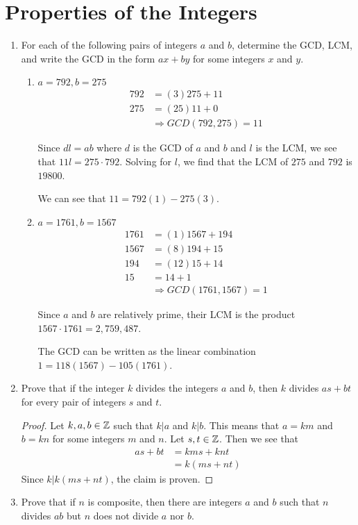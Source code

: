 \section{Properties of the Integers}
\begin{enumerate}
	\item For each of the following pairs of integers $a$ and $b$, determine the GCD, LCM, and write the GCD in the form $ax+by$ for some integers $x$ and $y$.
	\begin{enumerate}
		\item $a=792,b=275$
		\begin{equation*}
			\begin{split}
			792 &= (3)275 + 11 \\
			275 &= (25) 11 + 0\\
			& \Rightarrow GCD(792,275) = 11
			\end{split}
		\end{equation*}
		
		Since $dl = ab$ where $d$ is the GCD of $a$ and $b$ and $l$ is the LCM, we see that $11l = 275\cdot 792$.  Solving for $l$, we find that the LCM of $275$ and $792$ is $19800$.
		
		We can see that $11 = 792(1) - 275(3)$.  
		\item $a=1761,b=1567$
		\begin{equation*}
			\begin{split}
			1761 &= (1)1567 + 194 \\
			1567 &= (8)194 + 15\\
			194 &= (12)15+ 14\\
			15 &= 14+1\\
			& \Rightarrow GCD(1761,1567) = 1
			\end{split}
		\end{equation*}
		
		Since $a$ and $b$ are relatively prime, their LCM is the product $1567\cdot1761 = 2,759,487$.
		
		The GCD can be written as the linear combination $1 = 118(1567) - 105 (1761)$.
	\end{enumerate}
	\item Prove that if the integer $k$ divides the integers $a$ and $b$, then $k$ divides $as+bt$ for every pair of integers $s$ and $t$.
	\begin{proof}
		Let $k,a,b \in \mathbb{Z}$ such that $k|a$ and $k|b$.  This means that $a = km$ and $b = kn$ for some integers $m$ and $n$.  Let $s, t\in \mathbb{Z}$.   Then we see that 
		\begin{equation*}
			\begin{split}
				as+bt &= kms + knt\\
				& = k(ms+nt)
			\end{split}
		\end{equation*}
		Since $k|k(ms+nt)$, the claim is proven.
	\end{proof}
	\item Prove that if $n$ is composite, then there are integers $a$ and $b$ such that $n$ divides $ab$ but $n$ does not divide $a$ nor $b$.
	

\end{enumerate}
